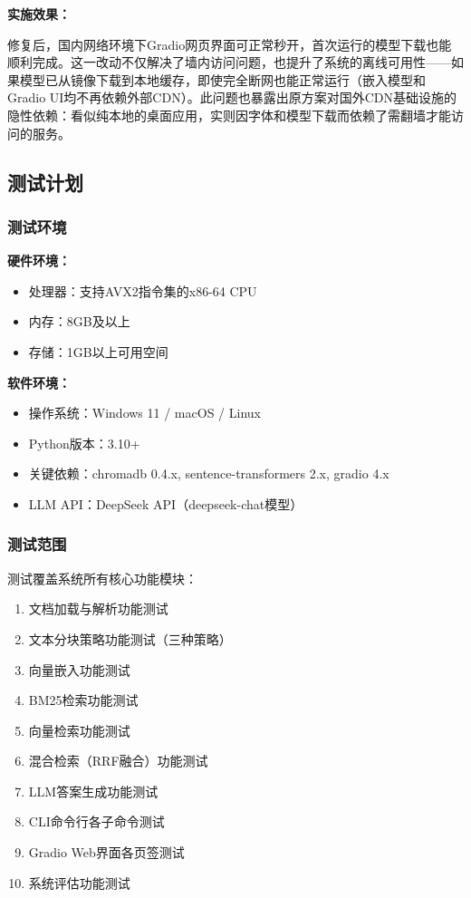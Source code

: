 \documentclass[10pt,a4paper]{article}
\begin{document}
\textbf{实施效果：}

修复后，国内网络环境下Gradio网页界面可正常秒开，首次运行的模型下载也能顺利完成。这一改动不仅解决了墙内访问问题，也提升了系统的离线可用性——如果模型已从镜像下载到本地缓存，即使完全断网也能正常运行（嵌入模型和Gradio UI均不再依赖外部CDN）。此问题也暴露出原方案对国外CDN基础设施的隐性依赖：看似纯本地的桌面应用，实则因字体和模型下载而依赖了需翻墙才能访问的服务。

\subsection{测试计划}

\subsubsection{测试环境}

\textbf{硬件环境：}
\begin{itemize}
\item 处理器：支持AVX2指令集的x86-64 CPU
\item 内存：8GB及以上
\item 存储：1GB以上可用空间
\end{itemize}

\textbf{软件环境：}
\begin{itemize}
\item 操作系统：Windows 11 / macOS / Linux
\item Python版本：3.10+
\item 关键依赖：chromadb 0.4.x, sentence-transformers 2.x, gradio 4.x
\item LLM API：DeepSeek API（deepseek-chat模型）
\end{itemize}

\subsubsection{测试范围}

测试覆盖系统所有核心功能模块：
\begin{enumerate}[label=(\arabic*)]
\item 文档加载与解析功能测试
\item 文本分块策略功能测试（三种策略）
\item 向量嵌入功能测试
\item BM25检索功能测试
\item 向量检索功能测试
\item 混合检索（RRF融合）功能测试
\item LLM答案生成功能测试
\item CLI命令行各子命令测试
\item Gradio Web界面各页签测试
\item 系统评估功能测试
\end{enumerate}
\end{document}
